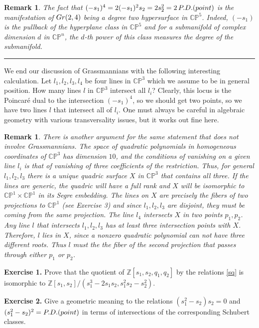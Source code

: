 \documentclass[11pt]{article}
\numberwithin{equation}{section}
\numberwithin{footnote}{section}
\newtheorem{rem}[thm]{Remark}
\newcommand{\blue}{\color{blue}}
\newcommand{\Gr}{{\rm Gr}}
\renewcommand{\P}{{\mathbb P}}
\newcommand{\Z}{{\mathbb Z}}
\newcommand{\C}{{\mathbb C}}
\begin{document}
\smallskip
\begin{rem}
The fact that $(-s_1)^4 = 2(-s_1)^2 s_2 = 2 s_2^2= 2\,{\rm P.D.(point)}$ is the manifestation of $\Gr(2,4)$ being a degree two hypersurface in $\C\P^5$. Indeed, $(-s_1)$ is the pullback of the hyperplane class in $\C\P^5$ and for a submanifold of complex dimension $d$ in $\C\P^n$, the $d$-th power of this class measures the degree of the submanifold.
\end{rem}

\smallskip
{\blue \hrule}
We end our discussion of Grassmannians with the following interesting calculation.
Let $l_1,l_2,l_3,l_4$ be four lines in $\C\P^3$ which we assume to be in general position. 
{\blue How many lines $l$ in $\C\P^3$ intersect all $l_i$?}
Clearly, this locus is the Poincar\'e dual to  the intersection $(-s_1)^4$, so we should get two points, so we have two lines $l$ that intersect all of $l_i$.
One must always be careful in algebraic geometry with various transversality issues, but it works out fine here.

\smallskip
\begin{rem}
There is another argument for the same statement that does not involve Grassmannians. The space of quadratic polynomials in homogeneous coordinates of $\C\P^3$ has dimension $10$, and the conditions of vanishing on a given line $l_i$ is that of vanishing of three coefficients of the restriction. Thus, for general $l_1,l_2,l_3$ there is a unique quadric surface $X$ in $\C\P^3$ that contains all three. If the lines are generic, the quadric will have a full rank and $X$ will be isomorphic to $\C\P^1\times \C\P^1$ in its Segre embedding. The lines on $X$ are precisely the fibers of 
two projections to $\C\P^1$ (see Exercise 3) and since $l_1,l_2,l_3$ are disjoint, they must be coming from the same projection. The line $l_4$ intersects $X$ in two points $p_1,p_2$. Any line $l$ that intersects $l_1,l_2,l_3$ has at least three intersection points with $X$. Therefore, $l$ lies in $X$, since a nonzero quadratic polynomial can not have three different roots. Thus $l$ must the the fiber of the second projection that passes through either $p_1$ or $p_2$.
\end{rem}

{\bf Exercise 1.} Prove that the quotient of $\Z[s_1,s_2,q_1,q_2]$ by the relations \eqref{sq} is isomorphic to
$
\Z[s_1,s_2]/(s_1^3 - 2 s_1 s_2, s_1^2 s_2 - s_2^2).
$

{\bf Exercise 2.} Give a geometric meaning to the relations
$(s_1^2-s_2)s_2=0$ and $(s_1^2 - s_2)^2={\rm P.D.(point)}$ in terms of intersections of the corresponding Schubert classes.
\end{document}
